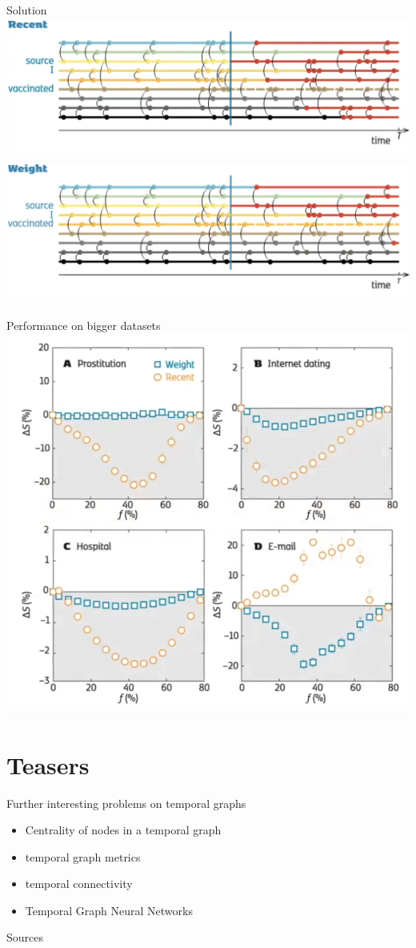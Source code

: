 \documentclass{beamer}
\begin{document}
\begin{frame}{Solution}
  \includegraphics[width=\linewidth]{media/solution_recent.png}
  \includegraphics[width=\linewidth]{media/solution_weight.png} 
\end{frame}

\begin{frame}{Performance on bigger datasets}
  \centering
  \includegraphics[width=0.6\linewidth]{media/performance_protocols.png}
  \cite{Lee_2012}
\end{frame}



\section{Teasers}
\begin{frame}{Further interesting problems on temporal graphs}
  \begin{itemize}
    \item Centrality of nodes in a temporal graph
    \item temporal graph metrics
    \item temporal connectivity
    \item Temporal Graph Neural Networks
  \end{itemize}
\end{frame}

\begin{frame}[allowframebreaks]{Sources}
\end{frame}
\end{document}
